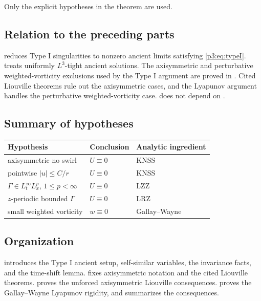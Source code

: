 \documentclass[11pt]{amsart}
\theoremstyle{plain}
\theoremstyle{definition}
\theoremstyle{remark}
\numberwithin{equation}{section}
\begin{document}
Only the explicit hypotheses in the theorem are used.

\subsection{Relation to the preceding parts}

 reduces Type I singularities to nonzero ancient
limits satisfying \eqref{p3:eq:typeI}.   treats
uniformly \(L^3\)-tight ancient solutions.  The axisymmetric and perturbative
weighted-vorticity exclusions used by the Type I argument are proved in
.  Cited
Liouville theorems rule out the axisymmetric cases, and the Lyapunov argument
handles the perturbative weighted-vorticity case.
 does not depend on
.

\subsection{Summary of hypotheses}

\begin{center}
\begin{tabular}{p{}p{}p{}}
\hline
Hypothesis & Conclusion & Analytic ingredient \\
\hline
axisymmetric no swirl & \(U\equiv0\) & KNSS \\
pointwise \(|u|\le C/r\) & \(U\equiv0\) & KNSS \\
\(\Gamma\in L_t^\infty L_x^p\), \(1\le p<\infty\) & \(U\equiv0\) & LZZ \\
\(z\)-periodic bounded \(\Gamma\) & \(U\equiv0\) & LRZ \\
small weighted vorticity & \(w\equiv0\) & Gallay--Wayne \\
\hline
\end{tabular}
\end{center}

\subsection{Organization}

 introduces the Type I ancient setup, self-similar variables, the
invariance facts, and the time-shift lemma.
 fixes axisymmetric notation and the
cited Liouville theorems.   proves the
unforced axisymmetric Liouville consequences.
 proves the Gallay--Wayne Lyapunov rigidity, and
 summarizes the consequences.
\end{document}
